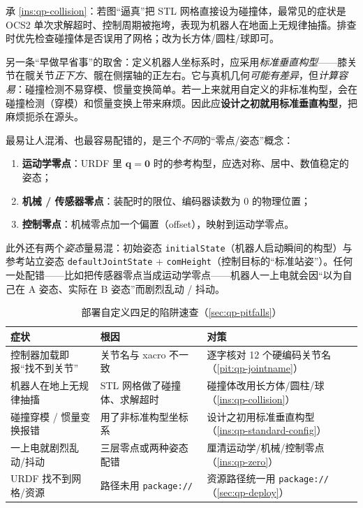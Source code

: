 \begin{pitfall}
承 \cref{ins:qp-collision}：若图“逼真”把 STL 网格直接设为碰撞体，最常见的症状是 OCS2 单次求解超时、控制周期被拖垮，表现为机器人在地面上无规律抽搐。排查时优先检查碰撞体是否误用了网格；改为长方体/圆柱/球即可。
\end{pitfall}

\begin{insight}\label{ins:qp-standard-config}
另一条“早做早省事”的取舍：定义机器人坐标系时，应采用\emph{标准垂直构型}——膝关节在髋关节\emph{正下方}、髋在侧摆轴的正左右。它与真机几何\emph{可能有差异}，但\emph{计算容易}：碰撞检测不易穿模、惯量变换简单。若一上来就用自定义的非标准构型，会在碰撞检测（穿模）和惯量变换上带来麻烦\cite{sleiman2021unified}。因此应\textbf{设计之初就用标准垂直构型}，把麻烦扼杀在源头。
\end{insight}

\begin{insight}\label{ins:qp-zero}
最易让人混淆、也最容易配错的，是三个\emph{不同}的“零点/姿态”概念：
\begin{enumerate}
  \item \textbf{运动学零点}：URDF 里 $\boldsymbol{q}=\boldsymbol{0}$ 时的参考构型，应选对称、居中、数值稳定的姿态；
  \item \textbf{机械 / 传感器零点}：装配时的限位、编码器读数为 $0$ 的物理位置；
  \item \textbf{控制零点}：机械零点加一个偏置（offset），映射到运动学零点。
\end{enumerate}
此外还有两个\emph{姿态}量易混：初始姿态 \texttt{initialState}（机器人启动瞬间的构型）与参考站立姿态 \texttt{defaultJointState} + \texttt{comHeight}（控制目标的“标准站姿”）。任何一处配错——比如把传感器零点当成运动学零点——机器人一上电就会因“以为自己在 A 姿态、实际在 B 姿态”而剧烈乱动 / 抖动\cite{sleiman2021unified}。
\end{insight}

\begin{table}[H]\centering\small
\caption{部署自定义四足的陷阱速查（\cref{sec:qp-pitfalls}）}
\begin{tabular}{p{} p{} p{}}
\toprule
症状 & 根因 & 对策 \\
\midrule
控制器加载即报“找不到关节” & 关节名与 xacro 不一致 & 逐字核对 12 个硬编码关节名（\cref{pit:qp-jointname}）\\
机器人在地上无规律抽搐 & STL 网格做了碰撞体、求解超时 & 碰撞体改用长方体/圆柱/球（\cref{ins:qp-collision}）\\
碰撞穿模 / 惯量变换报错 & 用了非标准构型坐标系 & 设计之初用标准垂直构型（\cref{ins:qp-standard-config}）\\
一上电就剧烈乱动/抖动 & 三层零点或两种姿态配错 & 厘清运动学/机械/控制零点（\cref{ins:qp-zero}）\\
URDF 找不到网格/资源 & 路径未用 \texttt{package://} & 资源路径统一用 \texttt{package://}（\cref{sec:qp-deploy}）\\
\bottomrule
\end{tabular}
\label{tab:qp-pitfalls}
\end{table}

